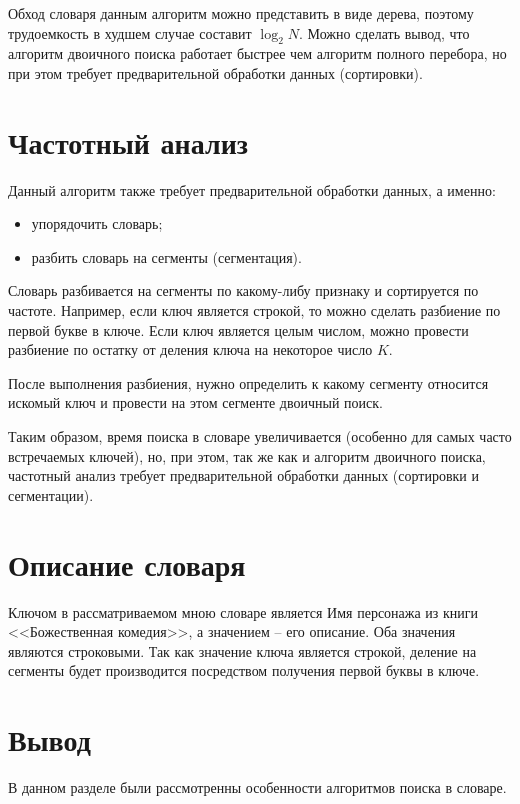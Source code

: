 \documentclass[12pt]{report}
\begin{document}
Обход словаря данным алгоритм можно представить в виде дерева, поэтому трудоемкость в худшем случае составит $\log_{2}{N}$. Можно сделать вывод, что алгоритм двоичного поиска работает быстрее чем алгоритм полного перебора, но при этом требует предварительной обработки данных (сортировки)\cite{levitin}.

\section{Частотный анализ}

Данный алгоритм также требует предварительной обработки данных, а именно:

\begin{itemize}
	\item упорядочить словарь;
	\item разбить словарь на сегменты (сегментация).
\end{itemize}

Словарь разбивается на сегменты по какому-либу признаку и сортируется по частоте. Например, если ключ является строкой, то можно сделать разбиение по первой букве в ключе. Если ключ является целым числом, можно провести разбиение по остатку от деления ключа на некоторое число $K$.

После выполнения разбиения, нужно определить к какому сегменту относится искомый ключ и провести на этом сегменте двоичный поиск.

Таким образом, время поиска в словаре увеличивается (особенно для самых часто встречаемых ключей), но, при этом, так же как и алгоритм двоичного поиска, частотный анализ требует предварительной обработки данных (сортировки и сегментации)\cite{koutiho}. 

\section{Описание словаря}

Ключом в рассматриваемом мною словаре является Имя персонажа из книги <<Божественная комедия>>\cite{dante}, а значением -- его описание. Оба значения являются строковыми. Так как значение ключа является строкой, деление на сегменты будет производится посредством получения первой буквы в ключе.

\section*{Вывод}
В данном разделе были рассмотренны особенности алгоритмов поиска в словаре.
\end{document}
